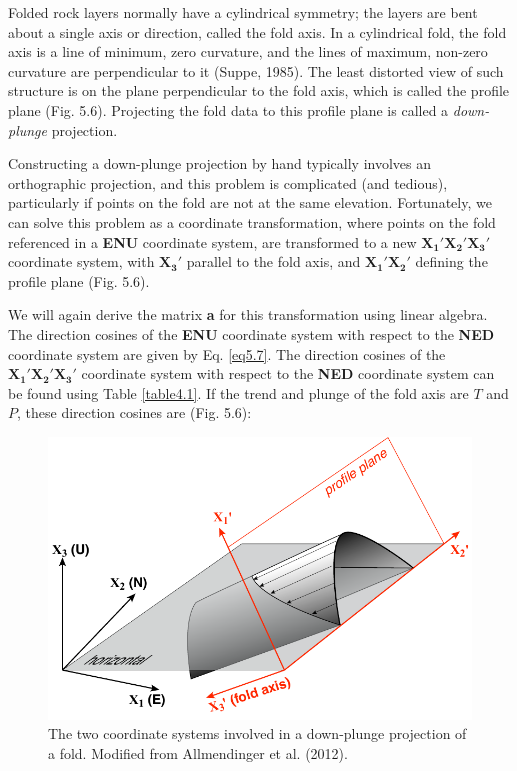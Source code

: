 \documentclass[a4paper , 12pt]{book}
\begin{document}
Folded rock layers normally have a cylindrical symmetry; the layers are bent about a single axis or direction, called the fold axis. In a cylindrical fold, the fold axis is a line of minimum, zero curvature, and the lines of maximum, non-zero curvature are perpendicular to it (Suppe, 1985). The least distorted view of such structure is on the plane perpendicular to the fold axis, which is called the profile plane (Fig. 5.6). Projecting the fold data to this profile plane is called a \textit{down-plunge} projection.

Constructing a down-plunge projection by hand typically involves an orthographic projection, and this problem is complicated (and tedious), particularly if points on the fold are not at the same elevation. Fortunately, we can solve this problem as a coordinate transformation, where points on the fold referenced in a \textbf{ENU} coordinate system, are transformed to a new $\mathbf{X_1\text{$'$}}\mathbf{X_2\text{$'$}}\mathbf{X_3\text{$'$}}$ coordinate system, with $\mathbf{X_3\text{$'$}}$ parallel to the fold axis, and $\mathbf{X_1\text{$'$}}\mathbf{X_2\text{$'$}}$ defining the profile plane (Fig. 5.6).

We will again derive the matrix \textbf{a} for this transformation using linear algebra. The direction cosines of the \textbf{ENU} coordinate system with respect to the \textbf{NED} coordinate system are given by Eq. \ref{eq5.7}. The direction cosines of the $\mathbf{X_1\text{$'$}}\mathbf{X_2\text{$'$}}\mathbf{X_3\text{$'$}}$ coordinate system with respect to the \textbf{NED} coordinate system can be found using Table \ref{table4.1}. If the trend and plunge of the fold axis are $T$ and $P$, these direction cosines are (Fig. 5.6):

\begin{figure}[ht]
    \centering
    \includegraphics[width=12cm]{ch5f7.pdf}
    \caption{The two coordinate systems involved in a down-plunge projection of a fold. Modified from Allmendinger et al. (2012).}
\end{figure}
\end{document}
